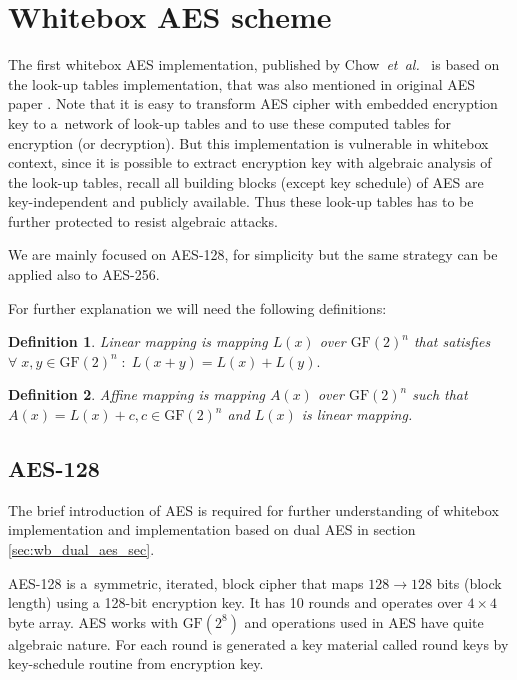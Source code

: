 \documentclass[11pt,oneside,final]{fithesis2}
\newtheorem{mydef}{Definition}
\newcommand{\gfe}{\ensuremath{\text{GF}\left(2^8\right)}}
\newcommand{\eal}{\emph{et~al.}}
\begin{document}
    \section{Whitebox AES scheme}

    The first whitebox AES implementation, published by Chow~\eal~\citep{Chow02white-boxcryptography} is based on the look-up tables implementation, that was also
    mentioned in original AES paper \citep{2002-daemen}. Note that it is easy to transform AES cipher with embedded encryption key 
    to a~network of look-up tables and to use these computed tables for encryption (or decryption). But this implementation is vulnerable in whitebox context,
    since it is possible to extract encryption key with algebraic analysis of the look-up tables, recall all building blocks (except key schedule) of AES are key-independent 
    and publicly available. Thus these look-up tables has to be further protected to resist algebraic attacks. 
    
    We are mainly focused on AES-128, for simplicity but the same strategy can be applied also to AES-256.

    For further explanation we will need the following definitions:

    \begin{mydef}\label{def:linear_mapping}
    Linear mapping is mapping $L\left(x\right)$ over $\text{GF}(2)^n$ that satisfies $\forall \; x,y \in \text{GF}(2)^n \; : \; L(x+y) = L(x) + L(y).$
    \end{mydef}
    
    \begin{mydef}\label{def:affine_mapping}
    Affine mapping is mapping $A(x)$ over $\text{GF}(2)^n$ such that $A(x) = L(x) + c, c \in \text{GF}(2)^n$ and $L(x)$ is linear mapping.
    \end{mydef}

    \subsection{AES-128}
    The brief introduction of AES is required for further understanding of whitebox implementation and implementation based on dual AES in section \ref{sec:wb_dual_aes_sec}.
    
    AES-128 is a~symmetric, iterated, block cipher that maps $128 \rightarrow 128$ bits (block length) using a 128-bit encryption key. It has 10 rounds and operates
    over $4\times4$ byte array. AES works with $\gfe$ and operations used in AES have quite algebraic nature. For each round is generated a key material called round keys
    by key-schedule routine from encryption key. 
    
\end{document}
